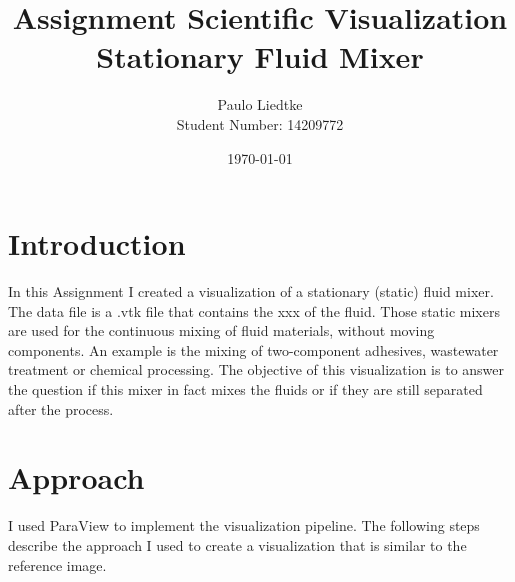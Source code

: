 \documentclass{article}
\begin{document}
\title{Assignment Scientific Visualization \\ \large{Stationary Fluid Mixer}}
\author{Paulo Liedtke \\ Student Number: 14209772}
\date{\today}

\maketitle

\section{Introduction}
In this Assignment I created a visualization of a stationary (static) fluid mixer. The data file is a .vtk file that contains the xxx of the fluid.
Those static mixers are used for the continuous mixing of fluid materials, without moving components. An example is the mixing of two-component adhesives, wastewater treatment or chemical processing.
The objective of this visualization is to answer the question if this mixer in fact mixes the fluids or if they are still separated after the process. 

\section{Approach}
I used ParaView to implement the visualization pipeline. The following steps describe the approach I used to create a visualization that is similar to the reference image.
\end{document}
